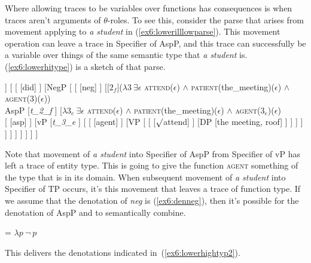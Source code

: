 Where allowing traces to be variables over functions has consequences is when traces aren't arguments of $\theta$-roles. To see this, consider the parse that arises from movement applying to \emph{a student} in (\ref{ex6:lowerilllowparse}). This movement operation can leave a trace in Specifier of AspP, and this trace can successfully be a variable over things of the same semantic type that \emph{a student} is. (\ref{ex6:lowerhitype}) is a sketch of that parse.
\medskip
\begin{fullwidth}
	\begin{exe}
		\raggedright
			\ex \label{ex6:lowerhitype}
			\small
			\begin{forest}
			[TP
				[DP [a student, roof] ]
				[
					[ [did] ]
					[NegP [
						[ [neg] ]
						[${[}2_{f}{]}$($\lambda 3\ \exists \epsilon$ \textsc{attend}($\epsilon$) $\wedge$ \textsc{patient}(the\_meeting)($\epsilon$) $\wedge$ \textsc{agent}($3$)($\epsilon$)) \\AspP
							[\emph{t_{2}_{f}} ]
							[$\lambda 3_e\ \exists \epsilon$ \textsc{attend}($\epsilon$) $\wedge$ \textsc{patient}(the\_meeting)($\epsilon$) $\wedge$ \textsc{agent}($3_e$)($\epsilon$) \\
								[ [asp] ]
								[vP
									[\emph{t_{3}_e} ]
									[
										[ [agent] ]
										[VP [
											[ [$\surd$attend] ]
											[DP [the meeting, roof] ]
										] ]
									 ]
								 ]
							 ]
						 ]
					] ]
				 ]
			]
			\end{forest}
		\end{exe}
\end{fullwidth}
Note that movement of \emph{a student} into Specifier of AspP from Specifier of vP has left a trace of entity type. This is going to give the function \textsc{agent} something of the type that is in its domain. When subsequent movement of \emph{a student} into Specifier of TP occurs, it's this movement that leaves a trace of function type. If we assume that the denotation of \emph{neg} is (\ref{ex6:denneg}), then it's possible for the denotation of AspP and  to semantically combine.
\medskip
\begin{exe}
\raggedright
	\ex \label{ex6:denneg}
	 = $\lambda p\ \neg\ p$
\end{exe}
This delivers the denotations indicated in~(\ref{ex6:lowerhightyp2}).
\medskip
